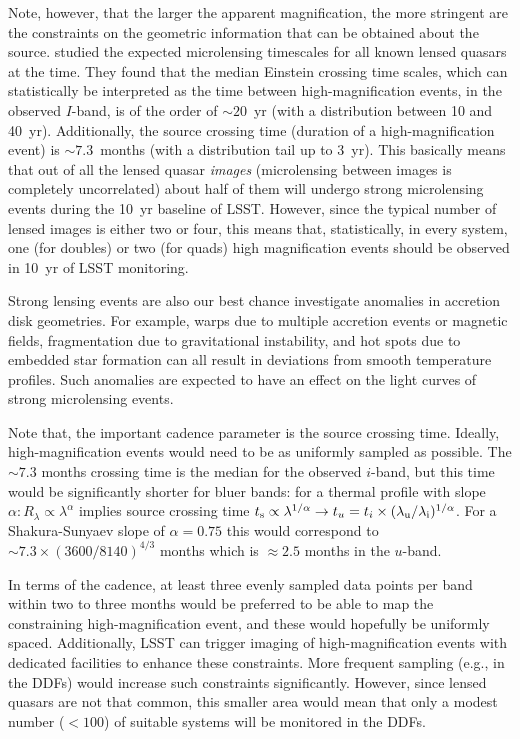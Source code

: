 Note, however, that the larger the apparent magnification, the more stringent are
the constraints on the geometric information that can be obtained about the source.
\citet{MosqueraandKochanek2011} studied the expected microlensing
timescales for all known lensed quasars at the time. They found that the median
Einstein crossing time scales, which can statistically be interpreted as the
time between high-magnification events, in the observed $I$-band, is of the order
of $\sim20$~yr (with a distribution between 10 and 40~yr). Additionally, the source
crossing time (duration of a high-magnification event) is $\sim7.3$~months (with
a distribution tail up to 3~yr). This basically means that out of all the lensed
quasar {\em images} (microlensing between images is completely uncorrelated)
about half of them will undergo strong microlensing events during the 10~yr
baseline of LSST. However,
since the typical number of lensed images is either two or four, this means
that, statistically, in every system, one (for doubles) or two (for quads) high
magnification events should be observed in 10~yr of LSST monitoring.

Strong lensing events are also our best chance investigate anomalies in accretion
disk geometries. For example, warps due to multiple accretion events or magnetic
fields, fragmentation due to gravitational instability, and hot spots due to
embedded star formation can all result in deviations from smooth temperature profiles.
Such anomalies are expected to have an effect on the light curves of strong microlensing events.

Note that, the important cadence parameter is the source crossing time. Ideally,
high-magnification events would need to be as uniformly sampled as possible. The
$\sim 7.3$ months crossing time is the median for the observed $i$-band, but this time
would be significantly shorter for bluer bands: for a thermal profile with slope
$\alpha: R_\lambda \propto \lambda^\alpha$ implies source crossing time $t_{\rm
s} \propto \lambda^{1/\alpha} \rightarrow t_u=t_i \times (\lambda_{\rm u} /
\lambda_{\rm i})^{1/\alpha}$. For a Shakura-Sunyaev slope of $\alpha=0.75$ this
would correspond to $\sim 7.3 \times (3600/8140)^{4/3}$ months which is $\approx 2.5$
months in the $u$-band.

In terms of the cadence, at least three evenly sampled data points per band
within two to three months would be preferred to be able to map the constraining
high-magnification event, and these would hopefully be uniformly spaced.
Additionally, LSST can trigger imaging of high-magnification events with dedicated
facilities to enhance these constraints. More frequent sampling (e.g., in the DDFs)
would increase such constraints significantly. However, since lensed quasars are not
that common, this smaller area would mean that only a modest number ($<100$)
of suitable systems will be monitored in the DDFs.

